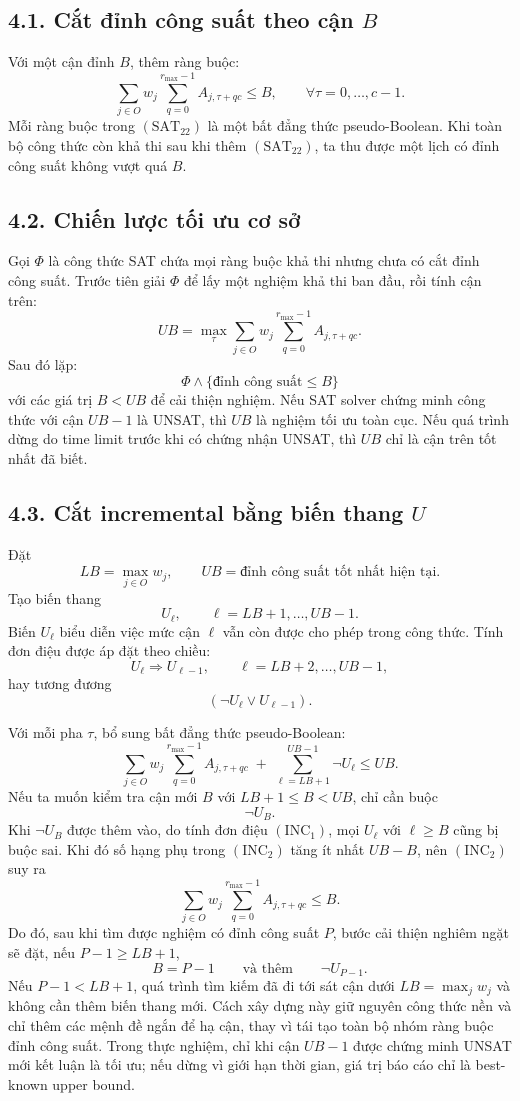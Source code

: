 \documentclass[12pt]{article}
\begin{document}
\subsection*{4.1. Cắt đỉnh công suất theo cận $B$}

Với một cận đỉnh $B$, thêm ràng buộc:
\[
\sum_{j\in O} w_j\sum_{q=0}^{r_{\max}-1} A_{j,\tau+qc}
\le B,
\qquad \forall \tau=0,\ldots,c-1.
\tag{SAT\_22}
\]
Mỗi ràng buộc trong $(\mathrm{SAT}_{22})$ là một bất đẳng thức pseudo-Boolean. Khi toàn bộ công thức còn khả thi sau khi thêm $(\mathrm{SAT}_{22})$, ta thu được một lịch có đỉnh công suất không vượt quá $B$.

\subsection*{4.2. Chiến lược tối ưu cơ sở}

Gọi $\Phi$ là công thức SAT chứa mọi ràng buộc khả thi nhưng chưa có cắt đỉnh công suất. Trước tiên giải $\Phi$ để lấy một nghiệm khả thi ban đầu, rồi tính cận trên:
\[
UB = \max_{\tau}
\sum_{j\in O} w_j\sum_{q=0}^{r_{\max}-1} A_{j,\tau+qc}.
\]
Sau đó lặp:
\[
\Phi \land \{ \text{đỉnh công suất}\le B\}
\]
với các giá trị $B<UB$ để cải thiện nghiệm. Nếu SAT solver chứng minh công thức với cận $UB-1$ là UNSAT, thì $UB$ là nghiệm tối ưu toàn cục. Nếu quá trình dừng do time limit trước khi có chứng nhận UNSAT, thì $UB$ chỉ là cận trên tốt nhất đã biết.

\subsection*{4.3. Cắt incremental bằng biến thang $U$}

Đặt
\[
LB=\max_{j\in O} w_j,\qquad UB=\text{đỉnh công suất tốt nhất hiện tại}.
\]
Tạo biến thang
\[
U_{\ell},\qquad \ell=LB+1,\ldots,UB-1.
\]
Biến $U_\ell$ biểu diễn việc mức cận $\ell$ vẫn còn được cho phép trong công thức. Tính đơn điệu được áp đặt theo chiều:
\[
U_{\ell}\Rightarrow U_{\ell-1},
\qquad \ell=LB+2,\ldots,UB-1,
\]
hay tương đương
\[
(\neg U_{\ell}\lor U_{\ell-1}).
\tag{INC\_1}
\]

Với mỗi pha $\tau$, bổ sung bất đẳng thức pseudo-Boolean:
\[
\sum_{j\in O} w_j\sum_{q=0}^{r_{\max}-1} A_{j,\tau+qc}
\;+\;
\sum_{\ell=LB+1}^{UB-1} \neg U_{\ell}
\le UB.
\tag{INC\_2}
\]
Nếu ta muốn kiểm tra cận mới $B$ với $LB+1\le B<UB$, chỉ cần buộc
\[
\neg U_{B}.
\tag{INC\_3}
\]
Khi $\neg U_B$ được thêm vào, do tính đơn điệu $(\mathrm{INC}_{1})$, mọi $U_\ell$ với $\ell\ge B$ cũng bị buộc sai. Khi đó số hạng phụ trong $(\mathrm{INC}_{2})$ tăng ít nhất $UB-B$, nên $(\mathrm{INC}_{2})$ suy ra
\[
\sum_{j\in O} w_j\sum_{q=0}^{r_{\max}-1} A_{j,\tau+qc}
\le B.
\]
Do đó, sau khi tìm được nghiệm có đỉnh công suất $P$, bước cải thiện nghiêm ngặt sẽ đặt, nếu $P-1\ge LB+1$,
\[
B=P-1
\qquad\text{và thêm}\qquad
\neg U_{P-1}.
\tag{INC\_4}
\]
Nếu $P-1<LB+1$, quá trình tìm kiếm đã đi tới sát cận dưới $LB=\max_j w_j$ và không cần thêm biến thang mới.
Cách xây dựng này giữ nguyên công thức nền và chỉ thêm các mệnh đề ngắn để hạ cận, thay vì tái tạo toàn bộ nhóm ràng buộc đỉnh công suất.
Trong thực nghiệm, chỉ khi cận $UB-1$ được chứng minh UNSAT mới kết luận là tối ưu; nếu dừng vì giới hạn thời gian, giá trị báo cáo chỉ là best-known upper bound.
\end{document}
